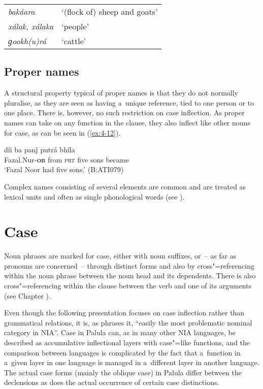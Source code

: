 \begin{table}[H]
\begin{tabularx}{\textwidth}{ l@{\hspace{40pt}} Q }
\textit{bakáara} &
`(flock of) sheep and goats'\\
\textit{xálak, xálaka} &
`people'\\
\textit{ɡookh(u)rá} &
`cattle'\\
\end{tabularx}
\end{table}

\subsection{Proper names}
\label{subsec:4-4-3}

A structural property typical of proper names is that they do not normally pluralise, as they are seen as having a~unique reference, tied to one person or to one place. There is, however, no such restriction on case inflection. As proper names can take on any function in the clause, they also inflect like other nouns for case, as can be seen in (\ref{ex:4-12}).

\begin{exe}
\ex
\label{ex:4-12}
\gll [fazelnuur-á] díi ba panǰ putrá bhíla \\
	Fazal.Nur-\textbf{\textsc{ob}} from \textsc{prt} five sons became\\
\glt `Fazal Noor had five sons.' (B:ATI079)
\end{exe}

Complex names consisting of several elements are common and are treated as lexical units and often as single phonological words (see ).

\section{Case}
\label{sec:4-5}

Noun phrases are marked for case, either with noun suffixes, or~-- as far as pronouns are concerned~-- through distinct forms and also by cross"=referencing within the noun phrase between the noun head and its dependents. There is also cross"=referencing within the clause between the verb and one of its arguments (see Chapter ).


Even though the following presentation focuses on case inflection rather than grammatical relations, it is, as \citet[230--231]{masica1991} phrases it, ``easily the most problematic nominal category in NIA''. Case in Palula can, as in many other NIA languages, be described as accumulative inflectional layers with case"=like functions, and the comparison between languages is complicated by the fact that a~function in a~given layer in one language is managed in a~different layer in another language. The actual case forms (mainly the oblique case) in Palula differ between the declensions as does the actual occurrence of certain case distinctions. 


